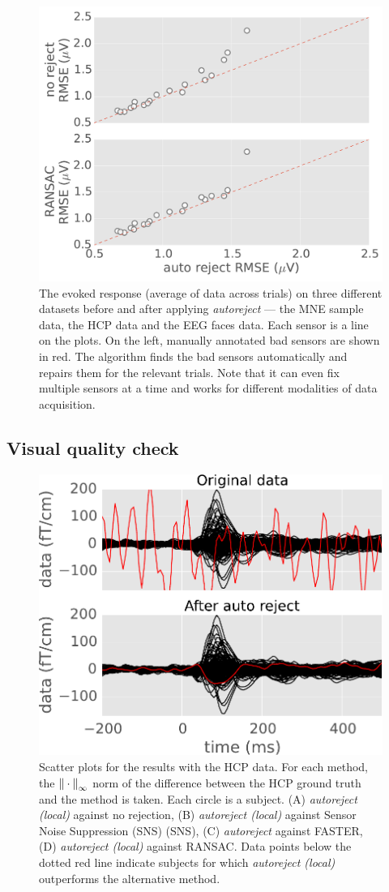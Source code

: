 \begin{figure}[htb!]
	\centering
	\includegraphics[width=0.8\linewidth]{figures/figure5.pdf}
    \caption{The evoked response (average of data across trials) on three different datasets before and after applying \emph{autoreject} --- the MNE sample data, the HCP data and the EEG faces data. Each sensor is a line on the plots. On the left, manually annotated bad sensors are shown in red. The algorithm finds the bad sensors automatically and repairs them for the relevant trials. Note that it can even fix multiple sensors at a time and works for different modalities of data acquisition.}
    \label{fig:sample_evoked}
\end{figure}

\subsection{Visual quality check}

\begin{figure}[htb!]
    \centering
    \includegraphics[width=0.75\linewidth]{figures/figure4.pdf}
    \caption{Scatter plots for the results with the HCP data. For each method, the ${\| \cdot \|}_{\mathrm{\infty}}$ norm of the difference between the HCP ground truth and the method is taken. Each circle is a subject. (A) \textit{autoreject (local)} against no rejection, (B) \textit{autoreject (local)} against Sensor Noise Suppression (SNS) (SNS), (C) \textit{autoreject} against FASTER, (D) \textit{autoreject (local)} against RANSAC. Data points below the dotted red line indicate subjects for which \textit{autoreject (local)} outperforms the alternative method.}
    \label{fig:hcp_scatter}
\end{figure}

